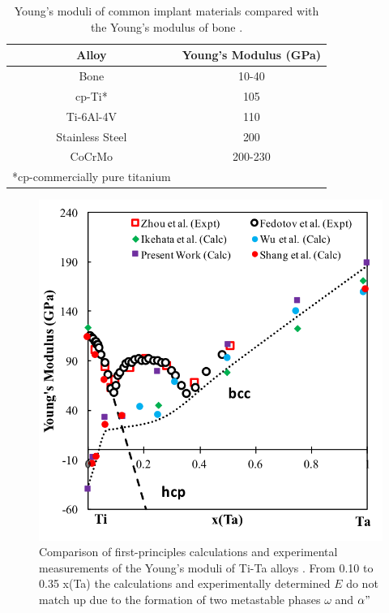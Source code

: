 				
\pagebreak
\begin{table}[H]
	\caption{Young's moduli of common implant materials compared with the Young's modulus of bone \cite{Long1998a}.}
	\centering
	\begin{tabular}{ c c }
		\hline
		Alloy & Young's Modulus (GPa) \\
		\hline
		Bone & 10-40\\
		cp-Ti* & 105\\
		Ti-6Al-4V & 110\\
		Stainless Steel & 200\\
		CoCrMo & 200-230\\
		\hline
		*cp-commercially pure titanium 
	\end{tabular}
\label{table:commonEM}
\end{table}
\clearpage

\newpage
\begin{figure}[H]
	\centering
	\includegraphics{Chapter-1/Figures/TiTaElastic.png}
	\caption{Comparison of first-principles calculations \cite{Wu2010a,Ikehata2004} and experimental measurements of the Young's moduli of Ti-Ta alloys \cite{Zhou2004a,Zhou2009a,Fedotov1985}. From 0.10 to 0.35 x(Ta) the calculations and experimentally determined $E$ do not match up due to the formation of two metastable phases $\omega$ and $\alpha"$}
	\label{Ch1-figure:titaelastic}
\end{figure}

